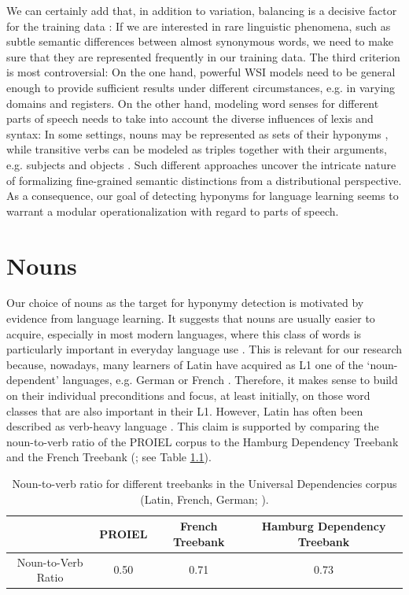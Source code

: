 \documentclass[oneside]{book}
\begin{document}
We can certainly add that, in addition to variation, balancing is a decisive factor for the training data \parencites[620]{liuCombiningIntegratedSampling2011}[9]{weiRoleBalancedTraining2013}[1127]{boneApplyingMachineLearning2015}: If we are interested in rare linguistic phenomena, such as subtle semantic differences between almost synonymous words, we need to make sure that they are represented frequently in our training data. The third criterion is most controversial: On the one hand, powerful \gls{WSI} models need to be general enough to provide sufficient results under different circumstances, e.g. in varying domains and registers. On the other hand, modeling word senses for different parts of speech needs to take into account the diverse influences of lexis and syntax: In some settings, nouns may be represented as sets of their hyponyms \parencite[640]{lewisCompositionalHyponymyPositive2019}, while transitive verbs can be modeled as triples together with their arguments, e.g. subjects and objects \parencite[9]{grefenstetteExperimentalSupportCategorical2011}. Such different approaches uncover the intricate nature of formalizing fine-grained semantic distinctions from a distributional perspective. As a consequence, our goal of detecting hyponyms for language learning seems to warrant a modular operationalization with regard to parts of speech. 

\chapter{Nouns}
Our choice of nouns as the target for hyponymy detection is motivated by evidence from language learning. It suggests that nouns are usually easier to acquire, especially in most modern languages, where this class of words is particularly important in everyday language use \parencite[9]{garcia-gamezLearningNounsVerbs2019}. This is relevant for our research because, nowadays, many learners of Latin have acquired as L1 one of the `noun-dependent' languages, e.g. German or French \parencite[51-52]{baidakKeyDataTeaching2017}. Therefore, it makes sense to build on their individual preconditions and focus, at least initially, on those word classes that are also important in their L1. However, Latin has often been described as verb-heavy language \parencite[41]{mengeLehrbuchLateinischenSyntax2009}. This claim is supported by comparing the noun-to-verb ratio \parencite[300]{stollNounsVerbsChintang2012} of the PROIEL corpus to the Hamburg Dependency Treebank \parencite{borgesvolkerHDTUDVeryLarge2019} and the French Treebank (\cite{seddahCheatingParserDeath2018}; see Table \ref{tableNounToVerbRatio}).
\begin{table}[ht]
	\begin{tabular}{ c | c | c | c }
  		 & PROIEL & French Treebank & Hamburg Dependency Treebank \\ \hline
  		Noun-to-Verb Ratio & 0.50 & 0.71 & 0.73 \\
	\end{tabular}
	\caption{Noun-to-verb ratio for different treebanks in the Universal Dependencies corpus (Latin, French, German; \cite{nivreUniversalDependenciesV12016}).}
	\label{tableNounToVerbRatio}
\end{table}
\end{document}

